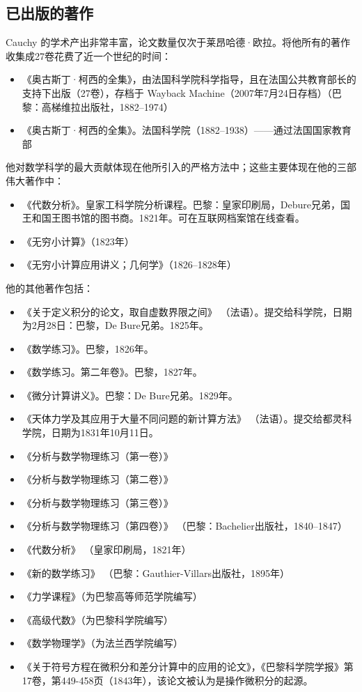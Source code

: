 \subsection{已出版的著作}
Cauchy 的学术产出非常丰富，论文数量仅次于莱昂哈德·欧拉。将他所有的著作收集成27卷花费了近一个世纪的时间：
\begin{itemize}
\item 《奥古斯丁·柯西的全集》，由法国科学院科学指导，且在法国公共教育部长的支持下出版（27卷），存档于 Wayback Machine（2007年7月24日存档）（巴黎：高梯维拉出版社，1882–1974）
\item 《奥古斯丁·柯西的全集》。法国科学院（1882–1938）——通过法国国家教育部
\end{itemize}
他对数学科学的最大贡献体现在他所引入的严格方法中；这些主要体现在他的三部伟大著作中：
\begin{itemize}
\item 《代数分析》。皇家工科学院分析课程。巴黎：皇家印刷局，Debure兄弟，国王和国王图书馆的图书商。1821年。可在互联网档案馆在线查看。
\item 《无穷小计算》（1823年）
\item 《无穷小计算应用讲义；几何学》（1826–1828年）
\end{itemize}
他的其他著作包括：
\begin{itemize}
\item 《关于定义积分的论文，取自虚数界限之间》 （法语）。提交给科学院，日期为2月28日：巴黎，De Bure兄弟。1825年。
\item 《数学练习》。巴黎，1826年。
\item 《数学练习。第二年卷》。巴黎，1827年。
\item 《微分计算讲义》。巴黎：De Bure兄弟。1829年。
\item 《天体力学及其应用于大量不同问题的新计算方法》 （法语）。提交给都灵科学院，日期为1831年10月11日。
\item 《分析与数学物理练习（第一卷）》  
\item 《分析与数学物理练习（第二卷）》  
\item 《分析与数学物理练习（第三卷）》  
\item 《分析与数学物理练习（第四卷）》 （巴黎：Bachelier出版社，1840–1847）  
\item 《代数分析》 （皇家印刷局，1821年）  
\item 《新的数学练习》 （巴黎：Gauthier-Villars出版社，1895年）  
\item 《力学课程》（为巴黎高等师范学院编写）  
\item 《高级代数》（为巴黎科学院编写）  
\item 《数学物理学》（为法兰西学院编写）  
\item 《关于符号方程在微积分和差分计算中的应用的论文》，《巴黎科学院学报》第17卷，第449-458页（1843年），该论文被认为是操作微积分的起源。
\end{itemize}
